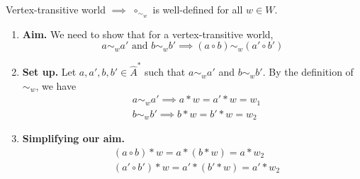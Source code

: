 \begin{propositionE}
    Vertex-transitive world $\implies$ $\circ_{\sim_{w}}$ is well-defined for all $w \in W$.
\end{propositionE}
\begin{proofE}
\begin{enumerate}[(1)]
    \item \textbf{Aim.}
    We need to show that for a vertex-transitive world,
    \begin{equation}
        a \sim_{w} a' \text{ and } b \sim_{w} b' \implies (a \circ b) \sim_{w} (a' \circ b')
    \end{equation}

    \item \textbf{Set up.}
    Let $a, a', b, b' \in \hat{A}^{*}$ such that $a \sim_{w} a'$ and $b \sim_{w} b'$.
    By the definition of $\sim_{w}$, we have
    \begin{align}
        & a \sim_{w} a' \implies a \ast w = a' \ast w = w_{1} \\
        & b \sim_{w} b' \implies b \ast w = b' \ast w = w_{2}
    \end{align}

    \item \textbf{Simplifying our aim.}
    \begin{align}
        & (a \circ b) \ast w = a \ast (b \ast w) = a \ast w_{2} \\
        & (a' \circ b') \ast w = a' \ast (b' \ast w) = a' \ast w_{2}
    \end{align}


\end{enumerate}
\end{proofE}
